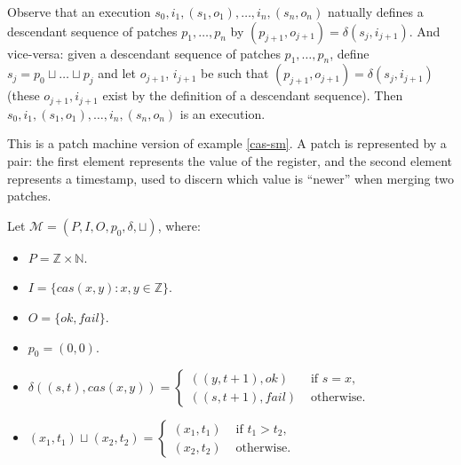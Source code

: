 \documentclass[12pt,a4paper,en]{pracamgr}
\newcommand{\mc}[1]{\mathcal{#1}}
\newcommand{\mbb}[1]{\mathbb{#1}}
\begin{document}
Observe that an execution $s_0, i_1, (s_1, o_1), \dots, i_n, (s_n, o_n)$ natually defines a descendant sequence of patches $p_1, \dots, p_n$ by $ (p_{j+1}, o_{j+1}) = \delta(s_j, i_{j+1})$. And vice-versa: given a descendant sequence of patches $p_1, \dots, p_n$, define $s_j = p_0 \sqcup \dots \sqcup p_j$ and let $o_{j+1}$, $i_{j+1}$ be such that $ (p_{j+1}, o_{j+1}) = \delta(s_j, i_{j+1})$ (these $o_{j+1}, i_{j+1}$ exist by the definition of a descendant sequence). Then $s_0, i_1, (s_1, o_1), \dots, i_n, (s_n, o_n)$ is an execution.

\begin{ex}\label{cas-machine}
    This is a patch machine version of example \ref{cas-sm}. A patch is represented by a pair: the first element represents the value of the register, and the second element represents a timestamp, used to discern which value is ``newer'' when merging two patches.

    Let $\mc M = (P, I, O, p_0, \delta, \sqcup)$, where:
	\begin{itemize}
		\item $P = \mbb Z \times \mbb N$.
		\item $I = \{cas(x, y): x, y \in \mbb Z\}$.
		\item $O = \{ok, fail\}$.
		\item $p_0 = (0, 0)$.
		\item $\delta((s, t), cas(x, y)) = \begin{cases} ((y, t+1), ok)&\text{ if }s = x,\\ ((s, t+1), fail)&\text{ otherwise.}\end{cases}$
		\item $(x_1, t_1) \sqcup (x_2, t_2) = \begin{cases} (x_1, t_1)&\text{ if }t_1 > t_2,\\ (x_2, t_2)&\text{ otherwise.}\end{cases}$
	\end{itemize}


\end{ex}
\end{document}
